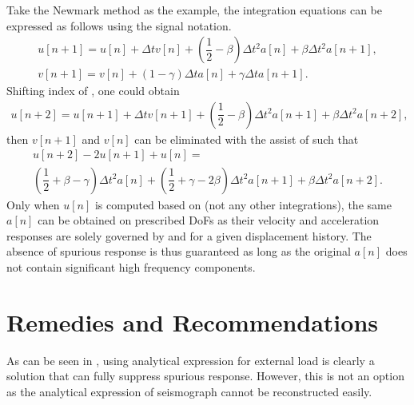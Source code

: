 Take the Newmark method as the example, the integration equations can be expressed as follows using the signal notation.
\begin{gather}\label{eq:nm_u}
u[n+1]=u[n]+\Delta{}tv[n]+\left(\dfrac{1}{2}-\beta\right)\Delta{}t^2a[n]+\beta\Delta{}t^2a[n+1],\\\label{eq:nm_v}
v[n+1]=v[n]+\left(1-\gamma\right)\Delta{}ta[n]+\gamma\Delta{}ta[n+1].
\end{gather}
Shifting index of , one could obtain
\begin{gather}
u[n+2]=u[n+1]+\Delta{}tv[n+1]+\left(\dfrac{1}{2}-\beta\right)\Delta{}t^2a[n+1]+\beta\Delta{}t^2a[n+2],
\end{gather}
then $v[n+1]$ and $v[n]$ can be eliminated with the assist of  such that
\begin{multline}\label{eq:nw_ua}
u[n+2]-2u[n+1]+u[n]=\\
\left(\dfrac{1}{2}+\beta-\gamma\right)\Delta{}t^2a[n]+\left(\dfrac{1}{2}+\gamma-2\beta\right)\Delta{}t^2a[n+1]+\beta\Delta{}t^2a[n+2].
\end{multline}
Only when $u[n]$ is computed based on  (not any other integrations), the same $a[n]$ can be obtained on prescribed DoFs as their velocity and acceleration responses are solely governed by  and  for a given displacement history. The absence of spurious response is thus guaranteed as long as the original $a[n]$ does not contain significant high frequency components.
%
\section{Remedies and Recommendations}
As can be seen in , using analytical expression for external load is clearly a solution that can fully suppress spurious response. However, this is not an option as the analytical expression of seismograph cannot be reconstructed easily.
